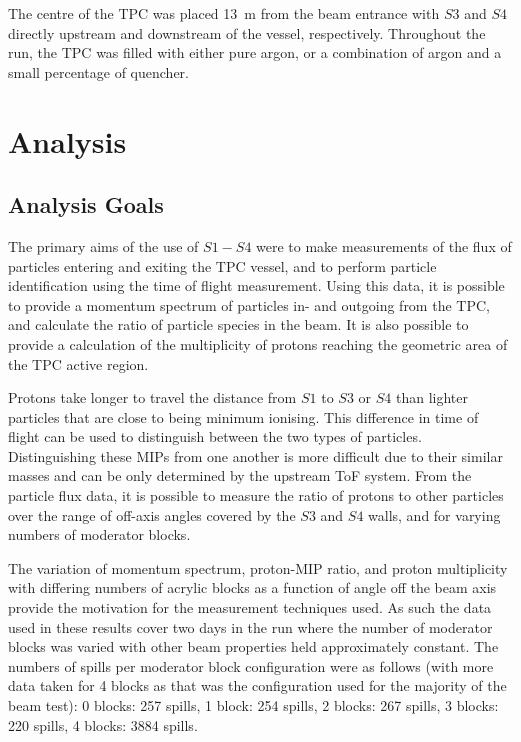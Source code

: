 The centre of the TPC was placed 13~m from the beam entrance with $S3$ and $S4$ directly upstream and downstream of the vessel, respectively. Throughout the run, the TPC was filled with either pure argon, or a combination of argon and a small percentage of quencher.



\section{Analysis}
\subsection{Analysis Goals}
The primary aims of the use of $S1 - S4$ were to make measurements of the flux of particles entering and exiting the TPC vessel, and to perform particle identification using the time of flight measurement.
Using this data, it is possible to provide a momentum spectrum of particles in- and outgoing from the TPC, and calculate the ratio of particle species in the beam. It is also possible to provide a calculation of the multiplicity of protons reaching the geometric area of the TPC active region.

Protons take longer to travel the distance from $S1$ to $S3$ or $S4$ than lighter particles that are close to being minimum ionising. This difference in time of flight can be used to distinguish between the two types of particles.
Distinguishing these MIPs from one another is more difficult due to their similar masses and can be only determined by the upstream ToF system.
From the particle flux data, it is possible to measure the ratio of protons to other particles over the range of off-axis angles covered by the $S3$ and $S4$ walls, and for varying numbers of moderator blocks.

The variation of momentum spectrum, proton-MIP ratio, and proton multiplicity with differing numbers of acrylic blocks as a function of angle off the beam axis provide the motivation for the measurement techniques used.
As such the data used in these results cover two days in the run where the number of moderator blocks was varied with other beam properties held approximately constant.
The numbers of spills per moderator block configuration were as follows (with more data taken for 4 blocks as that was the configuration used for the majority of the beam test):
0 blocks: 257 spills, 1 block:  254 spills, 2 blocks: 267 spills, 3 blocks: 220 spills, 4 blocks: 3884 spills.


